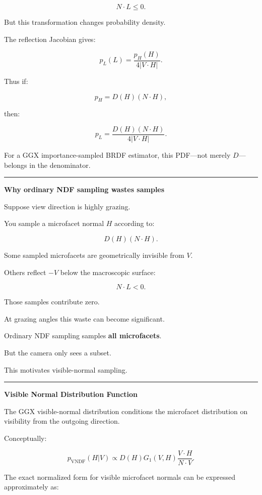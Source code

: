\[
N\cdot L\le0.
\]

But this transformation changes probability density.

The reflection Jacobian gives:

\[
\boxed{
p_L(L)
=
\frac{
p_H(H)
}{
4|V\cdot H|
}.
}
\]

Thus if:

\[
p_H=D(H)(N\cdot H),
\]

then:

\[
\boxed{
p_L
=
\frac{
D(H)(N\cdot H)
}{
4|V\cdot H|
}.
}
\]

For a GGX importance-sampled BRDF estimator, this PDF---not merely \(D\)---belongs in the denominator.

\begin{center}\rule{0.5\linewidth}{0.5pt}\end{center}

\textbf{Why ordinary NDF sampling wastes samples}

Suppose view direction is highly grazing.

You sample a microfacet normal \(H\) according to:

\[
D(H)(N\cdot H).
\]

Some sampled microfacets are geometrically invisible from \(V\).

Others reflect \(-V\) below the macroscopic surface:

\[
N\cdot L<0.
\]

Those samples contribute zero.

At grazing angles this waste can become significant.

Ordinary NDF sampling samples \textbf{all microfacets}.

But the camera only sees a subset.

This motivates visible-normal sampling.

\begin{center}\rule{0.5\linewidth}{0.5pt}\end{center}

\textbf{Visible Normal Distribution Function}

The GGX visible-normal distribution conditions the microfacet distribution on visibility from the outgoing direction.

Conceptually:

\[
\boxed{
p_{\text{VNDF}}(H|V)
\propto
D(H)
G_1(V,H)
\frac{
V\cdot H
}{
N\cdot V
}.
}
\]

The exact normalized form for visible microfacet normals can be expressed approximately as:

